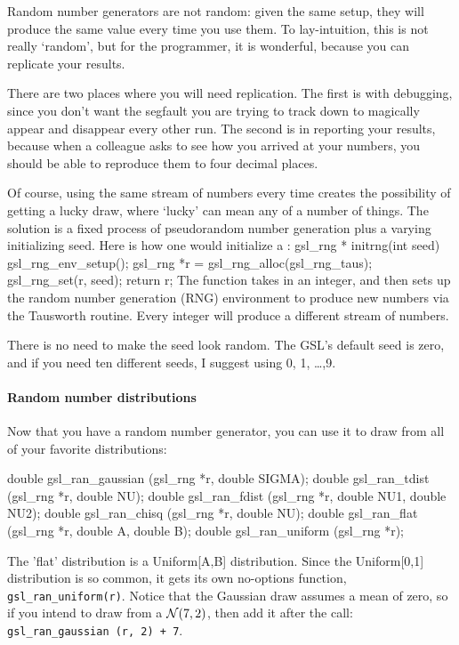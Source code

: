 Random number generators are not random: given the same setup, they
will produce the same value every time you use them. To lay-intuition,
this is not really `random', but for the programmer, it is wonderful,
because you can replicate your results.

There are two places where you will need replication. The first is with
debugging, since you don't want the segfault you are trying to track
down to magically appear and disappear every other run. The second is
in reporting your results, because when a colleague asks to see how you
arrived at your numbers, you should be able to reproduce them to four
decimal places.

Of course, using the same stream of numbers every time creates the
possibility of getting a lucky draw, where `lucky' can mean any of a
number of things. The solution is a fixed process of pseudorandom
number generation plus a varying initializing seed. Here is how one
would initialize a :
gsl_rng * initrng(int seed){
    gsl_rng_env_setup();
    gsl_rng *r  = gsl_rng_alloc(gsl_rng_taus);
    gsl_rng_set(r, seed);  
    return r;
}
The function takes in an integer, and then sets up the random number
generation (RNG) environment to produce new numbers via the Tausworth
routine. Every integer will produce a different stream of numbers.

There is no need to make the seed look random. The GSL's default seed is
zero, and if you need ten different seeds, I suggest using 0, 1, \dots ,9.

\paragraph{Random number distributions}
Now that you have a random number generator, you can use it to draw from all of your favorite distributions:
  
 


double gsl_ran_gaussian (gsl_rng *r, double SIGMA);
double gsl_ran_tdist (gsl_rng *r, double NU);
double gsl_ran_fdist (gsl_rng *r, double NU1, double NU2);
double gsl_ran_chisq (gsl_rng *r, double NU);
double gsl_ran_flat (gsl_rng *r, double A, double B);
double gsl_ran_uniform (gsl_rng *r);

The 'flat' distribution is a Uniform[A,B] distribution. Since the
Uniform[0,1] distribution is so common, it gets its own no-options
function, {\tt gsl\_ran\_uniform(r)}. Notice that the Gaussian draw
assumes a mean of zero, so if you intend to draw from a ${\cal N}(7,2)$,
then add it after the call: {\tt gsl\_ran\_gaussian (r, 2) + 7}.

